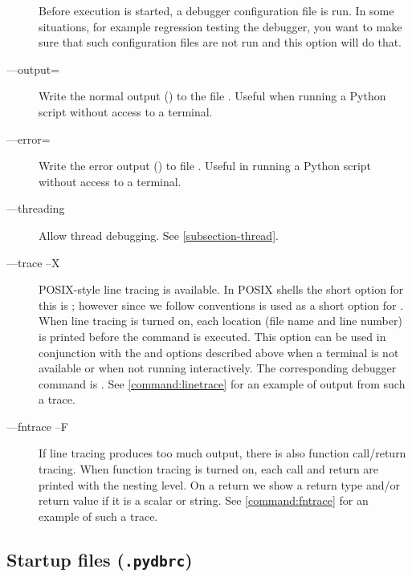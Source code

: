 \begin{description}
Before execution is started, a debugger configuration file
 is run. In some situations, for example regression
testing the debugger, you want to make sure that such configuration
files are not run and this option will do that.

\item[--{}--output=\var{filename}]

Write the normal output () to the file
. Useful when running a Python script without access to
a terminal.

\item[--{}--error=\var{filename}]

Write the error output
() to file . Useful in
 running a Python script without access to a terminal.

\item[--{}--threading]\label{switch:threading}
Allow thread debugging. See \ref{subsection-thread}.

\item[--{}--trace \code{\Large{|}}--X]\label{switch:trace}

POSIX-style line tracing is available. In POSIX shells the short
option for this is ; however since we follow 
conventions  is used as a short option for
. When line tracing is turned on, each location (file
name and line number) is printed before the command is executed. This
option can be used in conjunction with the  and
 options described above when a terminal is not
available or when not running interactively. The corresponding
debugger command is . See
\ref{command:linetrace} for an example of output from such a trace.

\item[--{}--fntrace \code{\Large{|}}--F]\label{switch:fntrace}

If line tracing produces too much output, there is also function
call/return tracing. When function tracing is turned on, each call and
return are printed with the nesting level. On a return we show a
return type and/or return value if it is a scalar or string.
See \ref{command:fntrace} for an example of such a trace.
\end{description}

\subsection{Startup files ({\tt .pydbrc})\label{subsection-startup-files}}

